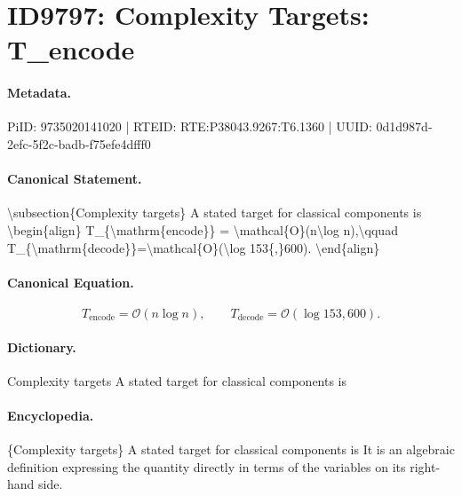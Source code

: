 \section*{ID9797: Complexity Targets: T\_encode}
\paragraph{Metadata.}
PiID: 9735020141020 | RTEID: RTE:P38043.9267:T6.1360 | UUID: 0d1d987d-2efc-5f2c-badb-f75efe4dfff0

\paragraph{Canonical Statement.}
\textbackslash{}subsection\{Complexity targets\} A stated target for classical components is \textbackslash{}begin\{align\} T\_\{\textbackslash{}mathrm\{encode\}\} = \textbackslash{}mathcal\{O\}(n\textbackslash{}log n),\textbackslash{}qquad T\_\{\textbackslash{}mathrm\{decode\}\}=\textbackslash{}mathcal\{O\}(\textbackslash{}log 153\{,\}600). \textbackslash{}end\{align\}

\paragraph{Canonical Equation.}
\[
T_{\mathrm{encode}} = \mathcal{O}(n\log n),\qquad T_{\mathrm{decode}}=\mathcal{O}(\log 153{,}600).
\]

\paragraph{Dictionary.}
Complexity targets A stated target for classical components is

\paragraph{Encyclopedia.}
\{Complexity targets\} A stated target for classical components is It is an algebraic definition expressing the quantity directly in terms of the variables on its right-hand side.
